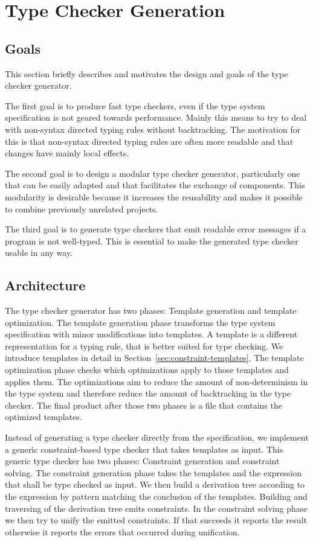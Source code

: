 \chapter{Type Checker Generation}
\section{Goals}
This section briefly describes and motivates the design and goals of
the type checker generator.

The first goal is to produce fast type checkers, even if the type
system specification is not geared towards performance. Mainly this
means to try to deal with non-syntax directed typing rules without
backtracking. The motivation for this is that non-syntax directed
typing rules are often more readable and that changes have mainly
local effects.

The second goal is to design a modular type checker generator,
particularly one that can be easily adapted and that facilitates the
exchange of components. This modularity is desirable because it
increases the reusability and makes it possible to combine previously
unrelated projects.

The third goal is to generate type checkers that emit readable error
messages if a program is not well-typed. This is essential to make the
generated type checker usable in any way.
\section{Architecture}
The type checker generator has two phases: Template generation and
template optimization. The template generation phase transforms the
type system specification with minor modifications into templates. A
template is a different representation for a typing rule, that is
better suited for type checking. We introduce templates in detail in
Section~\ref{sec:constraint-templates}. The template optimization
phase checks which optimizations apply to those templates and applies
them. The optimizations aim to reduce the amount of non-determinism in
the type system and therefore reduce the amount of backtracking in the
type checker. The final product after those two phases is a file that
contains the optimized templates.

Instead of generating a type checker directly from the specification,
we implement a generic constraint-based type checker that takes
templates as input. This generic type checker has two phases:
Constraint generation and constraint solving. The constraint
generation phase takes the templates and the expression that shall be
type checked as input. We then build a derivation tree according to
the expression by pattern matching the conclusion of the
templates. Building and traversing of the derivation tree emits
constraints. In the constraint solving phase we then try to unify the
emitted constraints. If that succeeds it reports the result otherwise
it reports the errors that occurred during unification.

